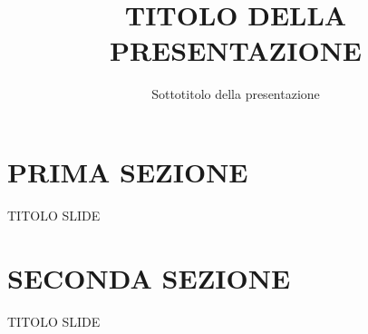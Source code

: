 \documentclass[aspectratio=169]{beamer}
\title{TITOLO DELLA PRESENTAZIONE}
\subtitle{Sottotitolo della presentazione}
\date{}
\institute{\textit{
        Fonti:
        \begin{itemize}
            \item[-] prima fonte
            \item[-] seconda fonte
        \end{itemize}
    }
}
\begin{document}
\begin{frame}
    \titlepage
\end{frame}

\section{PRIMA SEZIONE}

\begin{frame}{TITOLO SLIDE}
    
\end{frame}

\section{SECONDA SEZIONE}

\begin{frame}{TITOLO SLIDE}

\end{frame}
\end{document}

